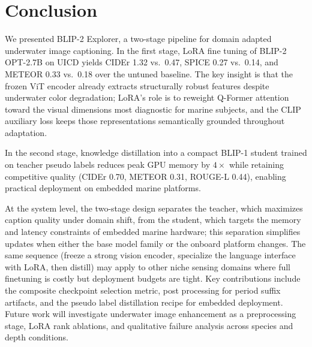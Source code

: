 \documentclass[journal]{IEEEtran}
\begin{document}
\FloatBarrier
\section{Conclusion}

We presented BLIP-2 Explorer, a two-stage pipeline for domain adapted underwater image captioning. In the first stage, LoRA fine tuning of BLIP-2 OPT-2.7B on UICD yields CIDEr 1.32 vs.\ 0.47, SPICE 0.27 vs.\ 0.14, and METEOR 0.33 vs.\ 0.18 over the untuned baseline. The key insight is that the frozen ViT encoder already extracts structurally robust features despite underwater color degradation; LoRA's role is to reweight Q-Former attention toward the visual dimensions most diagnostic for marine subjects, and the CLIP auxiliary loss keeps those representations semantically grounded throughout adaptation.

In the second stage, knowledge distillation into a compact BLIP-1 student trained on teacher pseudo labels reduces peak GPU memory by $4\times$ while retaining competitive quality (CIDEr 0.70, METEOR 0.31, ROUGE-L 0.44), enabling practical deployment on embedded marine platforms.

At the system level, the two-stage design separates the teacher, which maximizes caption quality under domain shift, from the student, which targets the memory and latency constraints of embedded marine hardware; this separation simplifies updates when either the base model family or the onboard platform changes.
The same sequence (freeze a strong vision encoder, specialize the language interface with LoRA, then distill) may apply to other niche sensing domains where full finetuning is costly but deployment budgets are tight.
Key contributions include the composite checkpoint selection metric, post processing for period suffix artifacts, and the pseudo label distillation recipe for embedded deployment. Future work will investigate underwater image enhancement as a preprocessing stage, LoRA rank ablations, and qualitative failure analysis across species and depth conditions.



\end{document}
